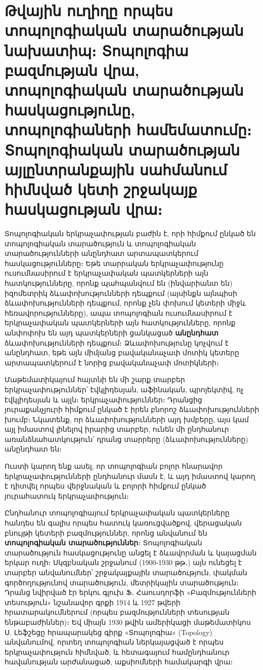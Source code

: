 \documentclass[./main.tex]{subfiles}
\begin{document}
\onehalfspacing

\section{Թվային ուղիղը որպես տոպոլոգիական տարածության նախատիպ։ Տոպոլոգիա բազմության վրա, տոպոլոգիական տարածության հասկացությունը, տոպոլոգիաների համեմատումը։ Տոպոլոգիական տարածության այլընտրանքային սահմանում հիմնված կետի շրջակայք հասկացության վրա։}\label{sec:4}

\par Տոպոլոգիական երկրաչափության բաժին է, որի հիմքում ընկած են տոպոլոգիա\-կան տարածություն և տոպոլոգիական տարածությունների անընդհատ արտա\-պատ\-կերում հասկացությունները։ Եթե տարրական երկրաչափությունը ուսումնասիրում է երկրաչա\-փական պատկերների այն հատկությունները, որոնք պահպանվում են (ինվարիանտ են) իզոմետրիկ  ձևափոխությունների դեպքում (այսինքն այնպիսի ձևափոխությունների դեպքում, որոնք չեն փոխում կետերի միջև հեռավորություն\-նե\-րը), ապա տոպոլոգիան ուսումնասիրում է երկրաչափական պատկերների այն հատ\-կու\-թյունները, որոնք անփոփոխ են այդ պատկերների ցանկացած \textbf{անընդհատ} ձևափոխութ\-յունների դեպքում։ Ձևափոխությունը կոչվում է անընդհատ, եթե այն միմյանց բավականաչափ մոտիկ կետերը արտապատկերում է նորից բավականաչափ մոտիկների։

\par Մաթեմատիկայում հայտնի են մի շարք տարբեր երկրաչափություններ՝ էվկ\-լի\-դեսյան, աֆինական, պրոյեկտիվ, ոչ էվկլիդեսյան և այլն։ երկրաչափություններ։ Դրանցից յուրաքանչյուրի հիմքում ընկած է իրեն բնորոշ ձևափոխությունների խումբ։ Նկատենք, որ ձևափոխությունների այդ խմբերը, այս կամ այլ իմաստով լինելով իրարից տարբեր, ունեն մի ընդհանուր առանձնահատկություն՝ դրանց տար\-րերը (ձևափոխութ\-յունները) անընդհատ են։

\par Ուստի կարող ենք ասել, որ տոպոլոգիան բոլոր հնարավոր երկրաչափու\-թյուն\-ների ընդհանուր մասն է, և այդ իմաստով կարող է դիտվել որպես վերջնական և բոլորի հիմքում ընկած յուրահատուկ երկրաչափություն։

\par Ընդհանուր տոպոլոգիայում երկրաչափական պատկերները հանդես են գալիս որպես հատուկ կառուցվածքով, վերացական բնույթի կետերի բազմություններ, որոնց անվանում են \textbf{տոպոլոգիական տարածություններ}։ Տոպոլոգիական տարածություն հասկա\-ցու\-թյունը անցել է ձևավորման և կայացման երկար ուղի։ Սկզբնական շրջանում (1900-1930 թթ․) այն ունեցել է տարբեր անվանումներ՝ շրջակայքային տարածություն, փակման գործողութ\-յունով տարածություն, մետրիկային տարածություն։ Դրանց նվիրված էր երկու գլուխ Ֆ․ Հաուսդորֆի «Բազմությունների տեսություն» նշանա\-վոր գրքի 1914 և 1927 թվերի հրատարակումներում (որպես բազմությունների տեսու\-թյան ենթաբաժիններ)։ Եվ միայն 1930 թվին ամերիկացի մաթեմատիկոս Ս. Լեֆշեցը հրապարակեց գիրք «Տոպոլոգիա» (Topology) անվանումով, որտեղ տոպոլոգիան ներկայացված է որպես երկրաչա\-փություն հիմնված, և հետագայում համընդհանուր հավանության արժանացած, աքսիոմների համակարգի վրա։
\end{document}
